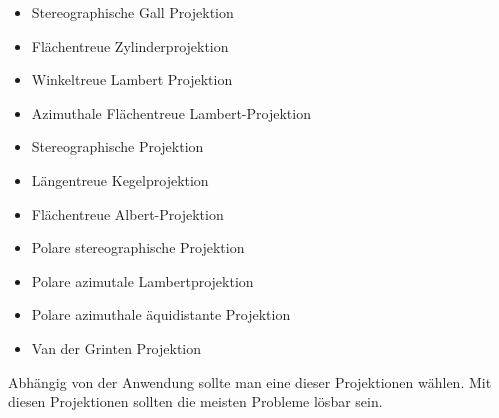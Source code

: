\begin{itemize}
\item Stereographische Gall Projektion\\
\item Flächentreue Zylinderprojektion\\
\item Winkeltreue Lambert Projektion\\
\item Azimuthale Flächentreue Lambert-Projektion\\
\item Stereographische Projektion\\
\item Längentreue Kegelprojektion\\
\item Flächentreue Albert-Projektion\\
 \item Polare stereographische Projektion\\
\item Polare azimutale Lambertprojektion\\
\item Polare azimuthale äquidistante Projektion \\
\item Van der Grinten Projektion \\
\end{itemize}
Abhängig von der Anwendung sollte man eine dieser Projektionen wählen. Mit diesen Projektionen sollten die meisten Probleme lösbar sein.